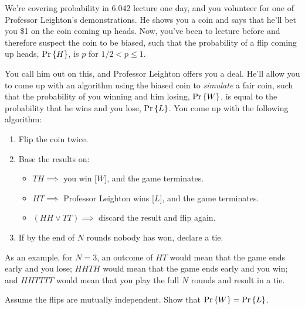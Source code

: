 \documentclass[twoside,12pt]{article}
\begin{document}
\vspace{0.15in}
\begin{problem}{10}
We're covering probability in 6.042 lecture one day, and you volunteer for one of Professor Leighton's demonstrations. He shows you a coin and says that he'll bet you \$1 on the coin coming up heads. Now, you've been to lecture before and therefore suspect the coin to be biased, such that the probability of a flip coming up heads, $\mathop{\textup{Pr}}\nolimits\left\{H\right\}$, is $p$ for $1/2 < p \leq 1$.

You call him out on this, and Professor Leighton offers you a deal. He'll allow you to come up with an algorithm using the biased coin to \textit{simulate} a fair coin, such that the probability of you winning and him losing, $\mathop{\textup{Pr}}\nolimits\left\{W\right\}$, is equal to the probability that he wins and you lose, $\mathop{\textup{Pr}}\nolimits\left\{L\right\}$. You come up with the following algorithm:

\begin{enumerate}
\item Flip the coin twice.
\item Base the results on:
	\begin{itemize}
	\item $TH \implies$ you win [$W$], and the game terminates.
	\item $HT \implies$ Professor Leighton wins [$L$], and the game terminates.
	\item $(HH \lor TT) \implies$ discard the result and flip again.
	\end{itemize}
\item If by the end of $N$ rounds nobody has won, declare a tie.
\end{enumerate}
As an example, for $N=3$, an outcome of $HT$ would mean that the game ends early and you lose; $HHTH$ would mean that the game ends early and you win; and $HHTTTT$ would mean that you play the full $N$ rounds and result in a tie.

\bparts

Assume the flips are mutually independent. Show that $\mathop{\textup{Pr}}\nolimits\left\{W\right\} = \mathop{\textup{Pr}}\nolimits\left\{L\right\}$.



\end{problem}
\end{document}
